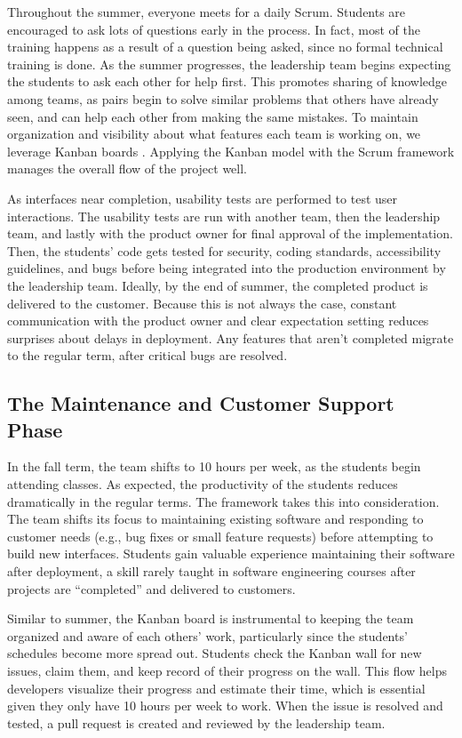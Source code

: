Throughout the summer, everyone meets for a daily Scrum. Students are encouraged to ask lots of questions early in the process. In fact, most of the training happens as a result of a question being asked, since no formal technical training is done. As the summer progresses, the leadership team begins expecting the students to ask each other for help first. This promotes sharing of knowledge among teams, as pairs begin to solve similar problems that others have already seen, and can help each other from making the same mistakes. To maintain organization and visibility about what features each team is working on, we leverage Kanban boards \cite{anderson2010kanban}. Applying the Kanban model with the Scrum framework manages the overall flow of the project well.

As interfaces near completion, usability tests \cite{usabilitytesting} are performed to test user interactions. The usability tests are run with another team, then the leadership team, and lastly with the product owner for final approval of the implementation. Then, the students’ code gets tested for security, coding standards, accessibility guidelines, and bugs before being integrated into the production environment by the leadership team. Ideally, by the end of summer, the completed product is delivered to the customer. Because this is not always the case, constant communication with the product owner and clear expectation setting reduces surprises about delays in deployment. Any features that aren't completed migrate to the regular term, after critical bugs are resolved.

\subsection{The Maintenance and Customer Support Phase}
In the fall term, the team shifts to 10 hours per week, as the students begin attending classes. As expected, the productivity of the students reduces dramatically in the regular terms. The framework takes this into consideration. The team shifts its focus to maintaining existing software and responding to customer needs (e.g., bug fixes or small feature requests) before attempting to build new interfaces. Students gain valuable experience maintaining their software after deployment, a skill rarely taught in software engineering courses after projects are ``completed'' and delivered to customers.

Similar to summer, the Kanban board is instrumental to keeping the team organized and aware of each others' work, particularly since the students' schedules become more spread out. Students check the Kanban wall for new issues, claim them, and keep record of their progress on the wall. This flow helps developers visualize their progress and estimate their time, which is essential given they only have 10 hours per week to work. When the issue is resolved and tested, a pull request is created and reviewed by the leadership team.
